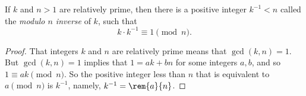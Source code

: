 \documentclass[handout]{mcs}
\begin{document}
\begin{lemma}
If $k$ and $n > 1$ are relatively prime, then there is a positive integer
$k^{-1} < n$ called the \emph{modulo $n$ inverse} of $k$, such that
\[
k \cdot k^{-1} \equiv 1 \pmod n.
\]

\begin{proof}
That integers $k$ and $n$ are relatively prime means that $\gcd(k,n)=1$.
But $\gcd(k,n)=1$ implies that $1= ak+bn$ for some integers $a,b$, and so
$1 \equiv ak \pmod n$.  So the positive integer less than $n$ that is
equivalent to $a \pmod n$ is $k^{-1}$, namely, $k^{-1} = \rem{a}{n}$.
\end{proof}
\end{lemma}
\end{document}
